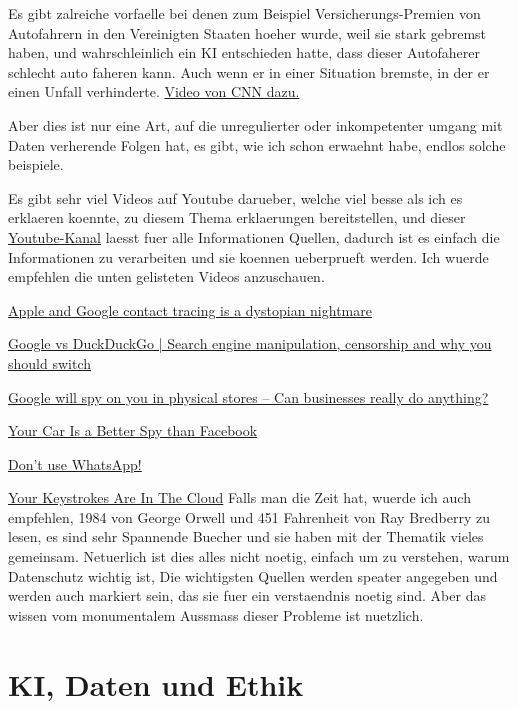 \documentclass{report}
\begin{document}
Es gibt zalreiche vorfaelle bei denen zum Beispiel Versicherungs-Premien von Autofahrern in den Vereinigten Staaten hoeher wurde, weil sie stark gebremst haben, und wahrschleinlich ein KI entschieden hatte, dass dieser Autofaherer schlecht auto faheren kann. Auch wenn er in einer Situation bremste, in der er einen Unfall verhinderte.
\hyperlink{https://youtube.com/watch?v=aHhx8mMUV2o}{Video von CNN dazu.}

Aber dies ist nur eine Art, auf die unregulierter oder inkompetenter umgang mit Daten verherende Folgen hat, es gibt, wie ich schon erwaehnt habe, endlos solche beispiele.

Es gibt sehr viel Videos auf Youtube darueber, welche viel besse als ich es erklaeren koennte, zu diesem Thema erklaerungen bereitstellen, und dieser \hyperlink{https://youtube.com/channel/UCjr2bPAyPV7t35MvcgT3W8Q}{Youtube-Kanal} laesst fuer alle Informationen Quellen, dadurch ist es einfach die Informationen zu verarbeiten und sie koennen ueberprueft werden.
Ich wuerde empfehlen die unten gelisteten Videos anzuschauen.

\hyperlink{https://youtube.com/watch?v=WRalTWAFBY4}{Apple and Google contact tracing is a dystopian nightmare}

\hyperlink{https://youtube.com/watch?v=SrsCEbi5N7Y}{Google vs DuckDuckGo | Search engine manipulation, censorship and why you should switch}

\hyperlink{https://youtube.com/watch?v=vZBa5-wFAfQ}{Google will spy on you in physical stores – Can businesses really do anything?}

\hyperlink{https://youtube.com/watch?v=WX2SWUMt_fk}{Your Car Is a Better Spy than Facebook}

\hyperlink{https://youtube.com/watch?v=shpiVm1qpnw}{Don't use WhatsApp!}

\hyperlink{https://youtube.com/watch?v=vCRX0MZm2KI}{Your Keystrokes Are In The Cloud}
\newline
Falls man die Zeit hat, wuerde ich auch empfehlen, 1984 von George Orwell und 451 Fahrenheit von Ray Bredberry zu lesen, es sind sehr Spannende Buecher und sie haben mit der Thematik vieles gemeinsam.
Netuerlich ist dies alles nicht noetig, einfach um zu verstehen, warum Datenschutz wichtig ist, Die wichtigsten Quellen werden speater angegeben und werden auch markiert sein, das sie fuer ein verstaendnis noetig sind. Aber das wissen vom monumentalem Aussmass dieser Probleme ist nuetzlich. 
\chapter{KI, Daten und Ethik}
\end{document}
